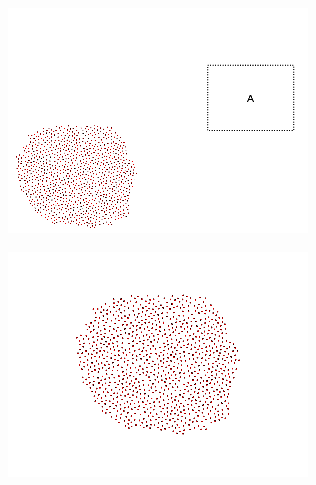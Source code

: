 \begin{minipage}{\linewidth}
	\centering	
	\begin{minipage}{0.42\linewidth}
		\includegraphics[width=\linewidth]{../ui_experiment/slide_images/Swarm_Robot_Control_-_1000_Robot_0035.png}
		\label{fig:sub1}
	\end{minipage}
	\hspace{0.05\linewidth}
	\begin{minipage}{0.42\linewidth}
		\includegraphics[width=\linewidth]{../ui_experiment/slide_images/Swarm_Robot_Control_-_1000_Robot_0037.png}
		\label{fig:sub2}
	\end{minipage}
	\label{fig:1000_robot_slides}
\end{minipage}

